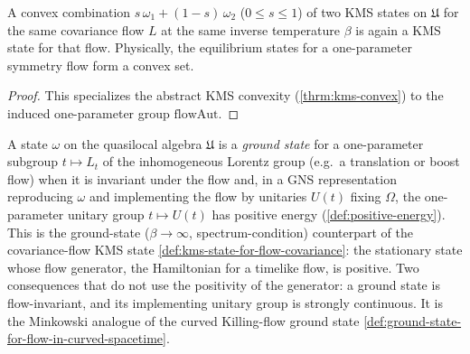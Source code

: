 \begin{theorem}
    \label{thrm:kms-convex-for-flow-covariance}
    \leanok
    A convex combination $s\,\omega_1 + (1-s)\,\omega_2$ ($0 \le s \le 1$) of two KMS states on $\mathfrak{U}$ for the same covariance flow $L$ at the same inverse temperature $\beta$ is again a KMS state for that flow. Physically, the equilibrium states for a one-parameter symmetry flow form a convex set.
\end{theorem}
\begin{proof}
    \leanok
    This specializes the abstract KMS convexity (\ref{thrm:kms-convex}) to the induced one-parameter group $\mathrm{flowAut}$.
\end{proof}

\begin{definition}
    \label{def:ground-state-for-flow-covariance}
    \leanok
    A state $\omega$ on the quasilocal algebra $\mathfrak{U}$ is a \emph{ground state} for a one-parameter subgroup $t \mapsto L_t$ of the inhomogeneous Lorentz group (e.g.\ a translation or boost flow) when it is invariant under the flow and, in a GNS representation reproducing $\omega$ and implementing the flow by unitaries $U(t)$ fixing $\Omega$, the one-parameter unitary group $t \mapsto U(t)$ has positive energy (\ref{def:positive-energy}). This is the ground-state ($\beta \to \infty$, spectrum-condition) counterpart of the covariance-flow KMS state \ref{def:kms-state-for-flow-covariance}: the stationary state whose flow generator, the Hamiltonian for a timelike flow, is positive. Two consequences that do not use the positivity of the generator: a ground state is flow-invariant, and its implementing unitary group is strongly continuous. It is the Minkowski analogue of the curved Killing-flow ground state \ref{def:ground-state-for-flow-in-curved-spacetime}.
\end{definition}
